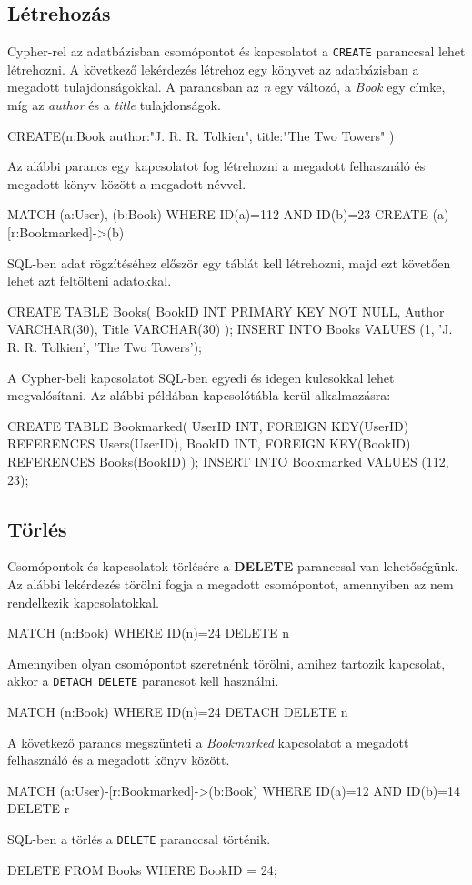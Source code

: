 
\subsection{Létrehozás}
Cypher-rel az adatbázisban csomópontot és kapcsolatot a \texttt{CREATE} paranccsal lehet létrehozni. A következő lekérdezés létrehoz egy könyvet az adatbázisban a megadott tulajdonságokkal. A parancsban az \textit{n} egy változó, a \textit{Book} egy címke, míg az \textit{author} és a \textit{title} tulajdonságok. 
\begin{java}
CREATE(n:Book{
  author:"J. R. R. Tolkien",
  title:"The Two Towers"
})
\end{java}
Az alábbi parancs egy kapcsolatot fog létrehozni a megadott felhasználó és megadott könyv között a megadott névvel.
\begin{java}
MATCH (a:User), (b:Book) 
WHERE ID(a)=112 AND ID(b)=23
CREATE (a)-[r:Bookmarked]->(b) 
\end{java}
SQL-ben adat rögzítéséhez először egy táblát kell létrehozni, majd ezt követően lehet azt feltölteni adatokkal.
\begin{java}
CREATE TABLE Books(
  BookID INT PRIMARY KEY NOT NULL,
  Author VARCHAR(30),
  Title VARCHAR(30)
);
INSERT INTO Books
VALUES (1, 'J. R. R. Tolkien', 'The Two Towers');
\end{java}
A Cypher-beli kapcsolatot SQL-ben egyedi és idegen kulcsokkal lehet megvalósítani. Az alábbi példában kapcsolótábla kerül alkalmazásra:
\begin{java}
CREATE TABLE Bookmarked(
  UserID INT, 
  FOREIGN KEY(UserID) REFERENCES Users(UserID),
  BookID INT, 
  FOREIGN KEY(BookID) REFERENCES Books(BookID)
);
INSERT INTO Bookmarked VALUES (112, 23);
\end{java}

\subsection{Törlés}
Csomópontok és kapcsolatok törlésére a \textbf{DELETE} paranccsal van lehetőségünk. Az alábbi lekérdezés törölni fogja a megadott csomópontot, amennyiben az nem rendelkezik kapcsolatokkal.
\begin{java}
MATCH (n:Book) 
WHERE ID(n)=24 
DELETE n
\end{java}
Amennyiben olyan csomópontot szeretnénk törölni, amihez tartozik kapcsolat, akkor a \texttt{DETACH DELETE} parancsot kell használni.
\begin{java}
MATCH (n:Book) 
WHERE ID(n)=24
DETACH DELETE n
\end{java}
A következő parancs megszünteti a \textit{Bookmarked} kapcsolatot a megadott felhasználó és a megadott könyv között.
\begin{java}
MATCH (a:User)-[r:Bookmarked]->(b:Book) 
WHERE ID(a)=12 AND ID(b)=14
DELETE r
\end{java}
SQL-ben a törlés a \texttt{DELETE} paranccsal történik.
\begin{java}
DELETE FROM Books 
WHERE BookID = 24;
\end{java}

